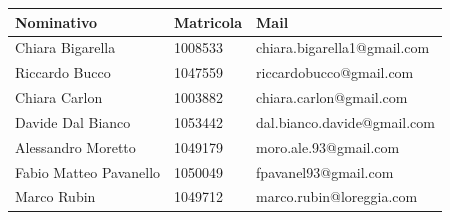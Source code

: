 	\begin{center}
	\begin{tabu} to \textwidth {|X[4]|X[2c]|X[5]|}
	\hline
     Nominativo & Matricola & Mail \\ \hline
     Chiara Bigarella & 1008533 & chiara.bigarella1@gmail.com \\ \hline
     Riccardo Bucco & 1047559 & riccardobucco@gmail.com \\ \hline
     Chiara Carlon & 1003882 & chiara.carlon@gmail.com \\ \hline
     Davide Dal Bianco & 1053442 & dal.bianco.davide@gmail.com \\ \hline
     Alessandro Moretto & 1049179 & moro.ale.93@gmail.com \\ \hline
     Fabio Matteo Pavanello & 1050049 & fpavanel93@gmail.com \\ \hline
     Marco Rubin & 1049712 & marco.rubin@loreggia.com \\ \hline
     \end{tabu}
	\end{center}